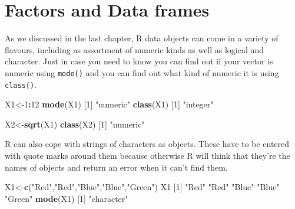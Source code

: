 \documentclass[
]{book}
\newenvironment{Shaded}{\begin{snugshade}}{\end{snugshade}}
\newcommand{\DecValTok}[1]{\textcolor[rgb]{0.00,0.00,0.81}{#1}}
\newcommand{\KeywordTok}[1]{\textcolor[rgb]{0.13,0.29,0.53}{\textbf{#1}}}
\newcommand{\NormalTok}[1]{#1}
\newcommand{\OperatorTok}[1]{\textcolor[rgb]{0.81,0.36,0.00}{\textbf{#1}}}
\newcommand{\StringTok}[1]{\textcolor[rgb]{0.31,0.60,0.02}{#1}}
\begin{document}
\hypertarget{factors-and-data-frames}{%
\section{Factors and Data frames}\label{factors-and-data-frames}}

As we discussed in the last chapter, R data objects can come in a variety of flavours, including as assortment of numeric kinds as well as logical and character. Just in case you need to know you can find out if your vector is numeric using \texttt{mode()} and you can find out what kind of numeric it is using \texttt{class()}.

\begin{Shaded}
\begin{Highlighting}[]
\NormalTok{X1<-}\DecValTok{1}\OperatorTok{:}\DecValTok{12}
\KeywordTok{mode}\NormalTok{(X1)}
\NormalTok{[}\DecValTok{1}\NormalTok{] }\StringTok{"numeric"}
\KeywordTok{class}\NormalTok{(X1)}
\NormalTok{[}\DecValTok{1}\NormalTok{] }\StringTok{"integer"}
\end{Highlighting}
\end{Shaded}

\begin{Shaded}
\begin{Highlighting}[]
\NormalTok{X2<-}\KeywordTok{sqrt}\NormalTok{(X1)}
\KeywordTok{class}\NormalTok{(X2)}
\NormalTok{[}\DecValTok{1}\NormalTok{] }\StringTok{"numeric"}
\end{Highlighting}
\end{Shaded}

R can also cope with strings of characters as objects. These have to be entered with quote marks around them because otherwise R will think that they're the names of objects and return an error when it can't find them.

\begin{Shaded}
\begin{Highlighting}[]
\NormalTok{X1<-}\KeywordTok{c}\NormalTok{(}\StringTok{"Red"}\NormalTok{,}\StringTok{"Red"}\NormalTok{,}\StringTok{"Blue"}\NormalTok{,}\StringTok{"Blue"}\NormalTok{,}\StringTok{"Green"}\NormalTok{)}
\NormalTok{X1}
\NormalTok{[}\DecValTok{1}\NormalTok{] }\StringTok{"Red"}   \StringTok{"Red"}   \StringTok{"Blue"}  \StringTok{"Blue"}  \StringTok{"Green"}
\KeywordTok{mode}\NormalTok{(X1)}
\NormalTok{[}\DecValTok{1}\NormalTok{] }\StringTok{"character"}
\end{Highlighting}
\end{Shaded}
\end{document}
